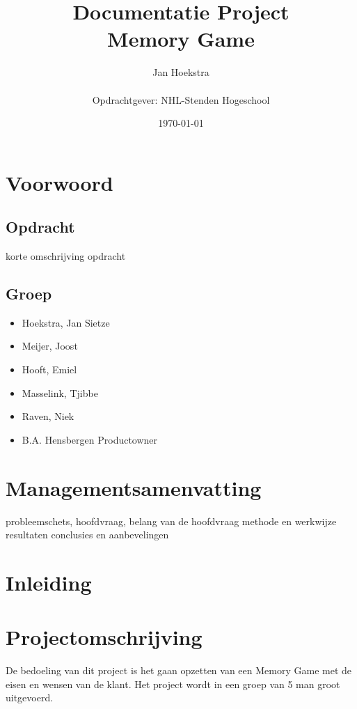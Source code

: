 \documentclass[a4paper,titlepage,11pt]{article}
\title{\Huge \color{dark} Documentatie Project \\
Memory Game}
\date{\color{dark}\today}
\author{\color{dark}Jan Hoekstra
\\ \\
Opdrachtgever: NHL-Stenden Hogeschool}
\begin{document}
\maketitle
\tableofcontents
\clearpage
{}

\section{Voorwoord}

\subsection{Opdracht}

korte omschrijving opdracht

\subsection{Groep}

\begin{itemize}
\item Hoekstra, Jan Sietze
\item Meijer, Joost
\item Hooft, Emiel
\item Masselink, Tjibbe
\item Raven, Niek
\item B.A. Hensbergen \- Productowner
\end{itemize}

\clearpage

\section{Managementsamenvatting}

probleemschets, hoofdvraag, belang van de hoofdvraag
methode en werkwijze
resultaten
conclusies en aanbevelingen

\clearpage

\section{Inleiding}

\clearpage

\section{Projectomschrijving}

De bedoeling van dit project is het gaan opzetten van een Memory Game met de eisen en wensen van de klant. Het project wordt in een groep van 5 man groot uitgevoerd.
\end{document}
